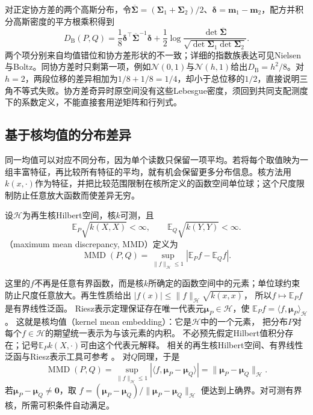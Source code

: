 对正定协方差的两个高斯分布，令\(\overline{\bm\Sigma}=(\bm\Sigma_1+\bm\Sigma_2)/2\)、\(\bm\delta=\bm m_1-\bm m_2\)，配方并积分高斯密度的平方根乘积得到
\begin{equation}
 D_{\mathrm B}(P,Q)
 =\frac18\bm\delta^\top\overline{\bm\Sigma}^{-1}\bm\delta
 +\frac12\log\frac{\det\overline{\bm\Sigma}}
 {\sqrt{\det\bm\Sigma_1\det\bm\Sigma_2}}.
 \label{eq:information-gaussian-bhattacharyya}
\end{equation}
两个项分别来自均值错位和协方差形状的不一致；详细的指数族表达可见Nielsen与Boltz。同协方差时只剩第一项，例如\(\mathcal N(0,1)\)与\(\mathcal N(h,1)\)给出\(D_{\mathrm B}=h^2/8\)。对\(h=2\)，两段位移的差异相加为\(1/8+1/8=1/4\)，却小于总位移的\(1/2\)，直接说明三角不等式失败。协方差奇异时原空间没有这些Lebesgue密度，须回到共同支配测度下的系数定义，不能直接套用逆矩阵和行列式。

\subsection{基于核均值的分布差异}
\label{sec:information-test-functions}

同一均值可以对应不同分布，因为单个读数只保留一项平均。若将每个取值映为一组丰富特征，再比较所有特征的平均，就有机会保留更多分布信息。核方法用\(k(x,\cdot)\)作为特征，并把比较范围限制在核所定义的函数空间单位球；这个尺度限制防止任意放大函数而使差异无穷。

\begin{definition}[最大均值差异]
\label{def:information-mmd}
设\(\mathcal H\)为再生核Hilbert空间，核\(k\)可测，且
\[
  \mathbb E_P\sqrt{k(X,X)}<\infty,\qquad
  \mathbb E_Q\sqrt{k(Y,Y)}<\infty.
\]
（maximum mean discrepancy, MMD）定义为
\[
  \operatorname{MMD}(P,Q)=
   \sup_{\|f\|_{\mathcal H}\leq1}|\mathbb E_Pf-\mathbb E_Qf|.
\]
\end{definition}

这里的\(f\)不再是任意有界函数，而是核\(k\)所确定的函数空间中的元素；单位球约束防止尺度任意放大。再生性质给出
\(|f(x)|\leq\|f\|_{\mathcal H}\sqrt{k(x,x)}\)，
所以\(f\mapsto\mathbb E_Pf\)是有界线性泛函。
Riesz表示定理保证存在唯一代表元\(\bm\mu_P\in\mathcal H\)，使
\(\mathbb E_Pf=\langle f,\bm\mu_P\rangle_{\mathcal H}\)。
这就是核均值（kernel mean embedding）：它是\(\mathcal H\)中的一个元素，
把分布\(P\)对每个\(f\in\mathcal H\)的期望统一表示为与该元素的内积。
不必预先假定Hilbert值积分存在；记号\(\mathbb E_Pk(X,\cdot)\)可由这个代表元解释。
相关的再生核Hilbert空间、有界线性泛函与Riesz表示工具可参考
。
对\(Q\)同理，于是
\[
  \operatorname{MMD}(P,Q)
  =\sup_{\|f\|_{\mathcal H}\leq1}
     |\langle f,\bm\mu_P-\bm\mu_Q\rangle|
  =\|\bm\mu_P-\bm\mu_Q\|_{\mathcal H}.
\]
若\(\bm\mu_P-\bm\mu_Q\neq\bm0\)，取
\(f=(\bm\mu_P-\bm\mu_Q)/\|\bm\mu_P-\bm\mu_Q\|_{\mathcal H}\)
便达到上确界。对可测有界核，所需可积条件自动满足。

